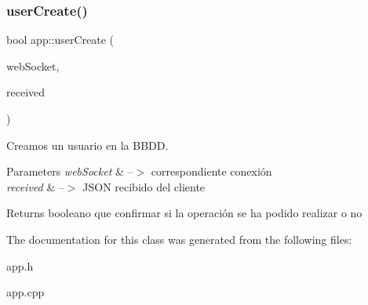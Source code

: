 \subsubsection{\texorpdfstring{user\+Create()}{userCreate()}}
{\footnotesize\ttfamily bool app\+::user\+Create (\begin{DoxyParamCaption}\item[{ix\+::\+Web\+Socket $\ast$}]{web\+Socket,  }\item[{J\+S\+ON}]{received }\end{DoxyParamCaption})}



Creamos un usuario en la B\+B\+DD. 


\begin{DoxyParams}{Parameters}
{\em web\+Socket} & --$>$ correspondiente conexión \\
\hline
{\em received} & --$>$ J\+S\+ON recibido del cliente \\
\hline
\end{DoxyParams}
\begin{DoxyReturn}{Returns}
booleano que confirmar si la operación se ha podido realizar o no 
\end{DoxyReturn}


The documentation for this class was generated from the following files\+:\begin{DoxyCompactItemize}
\item 
app.\+h\item 
app.\+cpp\end{DoxyCompactItemize}
